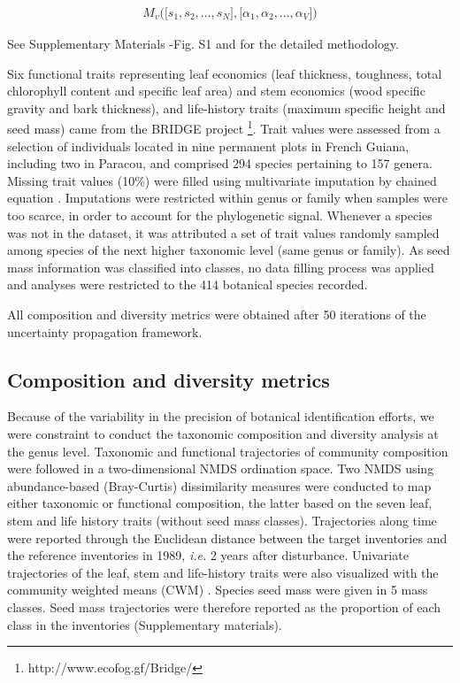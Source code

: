 \documentclass[fleqn,10pt]{ArtEcoFoG} %
\begin{document}
\begin{align}
M_v\Big(\big[s_1, s_2,..., s_N\big],\big[\alpha_1, \alpha_2,..., \alpha_V\big]\Big) \nonumber
\end{align}

See Supplementary Materials -Fig. S1 and \citet{Aubry-Kientz2013} for
the detailed methodology.

Six functional traits representing leaf economics (leaf thickness,
toughness, total chlorophyll content and specific leaf area) and stem
economics (wood specific gravity and bark thickness), and life-history
traits (maximum specific height and seed mass) came from the BRIDGE
project \footnote{http://www.ecofog.gf/Bridge/}. Trait values were
assessed from a selection of individuals located in nine permanent plots
in French Guiana, including two in Paracou, and comprised 294 species
pertaining to 157 genera. Missing trait values (10\%) were filled using
multivariate imputation by chained equation \citep{Mice2011}.
Imputations were restricted within genus or family when samples were too
scarce, in order to account for the phylogenetic signal. Whenever a
species was not in the dataset, it was attributed a set of trait values
randomly sampled among species of the next higher taxonomic level (same
genus or family). As seed mass information was classified into classes,
no data filling process was applied and analyses were restricted to the
414 botanical species recorded.

All composition and diversity metrics were obtained after 50 iterations
of the uncertainty propagation framework.

\subsection{Composition and diversity
metrics}\label{composition-and-diversity-metrics}

Because of the variability in the precision of botanical identification
efforts, we were constraint to conduct the taxonomic composition and
diversity analysis at the genus level. Taxonomic and functional
trajectories of community composition were followed in a two-dimensional
NMDS ordination space. Two NMDS using abundance-based (Bray-Curtis)
dissimilarity measures were conducted to map either taxonomic or
functional composition, the latter based on the seven leaf, stem and
life history traits (without seed mass classes). Trajectories along time
were reported through the Euclidean distance between the target
inventories and the reference inventories in 1989, \emph{i.e.} 2 years
after disturbance. Univariate trajectories of the leaf, stem and
life-history traits were also visualized with the community weighted
means (CWM) \citep{Diaz2007}. Species seed mass were given in 5 mass
classes. Seed mass trajectories were therefore reported as the
proportion of each class in the inventories (Supplementary materials).
\end{document}
